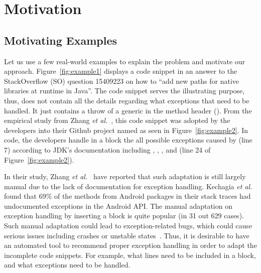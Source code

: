 \section{Motivation}
\label{motiv:sec}

\subsection{Motivating Examples}
\label{examples:sec}



Let us use a few real-world examples to explain the problem and
motivate our approach. Figure~\ref{fig:example1} displays a code
snippet in an answer to the StackOverflow (SO) question 15409223 on
how to ``add new paths for native libraries at runtime in Java''.  The
code snippet serves the illustrating purpose, thus, does not contain
all the details regarding what exceptions that need to be handled. It
just contains a throw of a generic  in the method
header (). From the empirical study from Zhang
{\em et al.}~\cite{zhang-icse19}, this code snippet was adopted by the
developers into their Github project named  as seen in
Figure~\ref{fig:example2}. In  code, the developers
handle in a  block the all possible exceptions caused
by  (line 7)
according to JDK's documentation including
, ,
, and
 (line 24 of
Figure~\ref{fig:example2}).

In their study, Zhang {\em et al.}~\cite{zhang-icse19} have reported
that such adaptation is still largely manual due to the lack of
documentation for exception handling. Kechagia {\em et
  al.}~\cite{kechagia-msr14} found that 69\% of the methods from
Android packages in their stack traces had undocumented exceptions in
the Android API. The manual adaptation on exception handling by
inserting a  block is quite popular (in 31 out 629
cases). Such manual adaptation could lead to exception-related bugs,
which could cause serious issues including crashes or unstable
states~\cite{xrank-fse20}. Thus, it is desirable to have an automated
tool to recommend proper exception handling in order to adapt the
incomplete code snippets. For example, what lines need to be included
in a  block, and what exceptions need to be handled.



